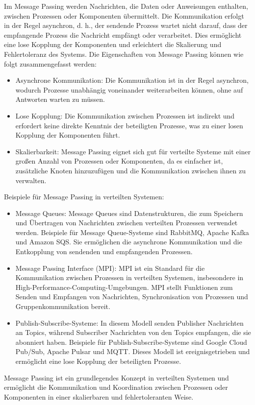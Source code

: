 Im Message Passing werden Nachrichten, die Daten oder Anweisungen enthalten, zwischen Prozessen oder Komponenten übermittelt. Die Kommunikation erfolgt in der Regel asynchron, d. h., der sendende Prozess wartet nicht darauf, dass der empfangende Prozess die Nachricht empfängt oder verarbeitet. Dies ermöglicht eine lose Kopplung der Komponenten und erleichtert die Skalierung und Fehlertoleranz des Systems. Die Eigenschaften von Message Passing können wie folgt zusammengefasst werden:
\begin{itemize}
\item Asynchrone Kommunikation: Die Kommunikation ist in der Regel asynchron, wodurch Prozesse unabhängig voneinander weiterarbeiten können, ohne auf Antworten warten zu müssen.
\item Lose Kopplung: Die Kommunikation zwischen Prozessen ist indirekt und erfordert keine direkte Kenntnis der beteiligten Prozesse, was zu einer losen Kopplung der Komponenten führt.
\item Skalierbarkeit: Message Passing eignet sich gut für verteilte Systeme mit einer großen Anzahl von Prozessen oder Komponenten, da es einfacher ist, zusätzliche Knoten hinzuzufügen und die Kommunikation zwischen ihnen zu verwalten.
\end{itemize}
Beispiele für Message Passing in verteilten Systemen:
\begin{itemize}
\item Message Queues: Message Queues sind Datenstrukturen, die zum Speichern und Übertragen von Nachrichten zwischen verteilten Prozessen verwendet werden. Beispiele für Message Queue-Systeme sind RabbitMQ, Apache Kafka und Amazon SQS. Sie ermöglichen die asynchrone Kommunikation und die Entkopplung von sendenden und empfangenden Prozessen.

\item Message Passing Interface (MPI): MPI ist ein Standard für die Kommunikation zwischen Prozessen in verteilten Systemen, insbesondere in High-Performance-Computing-Umgebungen. MPI stellt Funktionen zum Senden und Empfangen von Nachrichten, Synchronisation von Prozessen und Gruppenkommunikation bereit.

\item Publish-Subscribe-Systeme: In diesem Modell senden Publisher Nachrichten an Topics, während Subscriber Nachrichten von den Topics empfangen, die sie abonniert haben. Beispiele für Publish-Subscribe-Systeme sind Google Cloud Pub/Sub, Apache Pulsar und MQTT. Dieses Modell ist ereignisgetrieben und ermöglicht eine lose Kopplung der beteiligten Prozesse.
\end{itemize}
Message Passing ist ein grundlegendes Konzept in verteilten Systemen und ermöglicht die Kommunikation und Koordination zwischen Prozessen oder Komponenten in einer skalierbaren und fehlertoleranten Weise.

